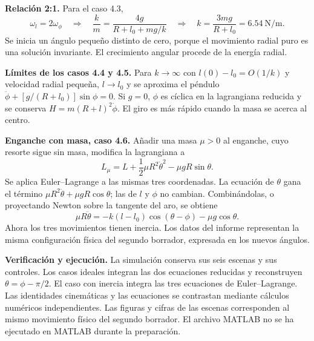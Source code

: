 \documentclass[11pt,a4paper]{article}
\begin{document}
\textbf{Relación 2:1.} Para el caso 4.3,
\begin{equation}
 \omega_l=2\omega_\phi\quad\Longrightarrow\quad
 \frac km=\frac{4g}{R+l_0+mg/k}\quad\Longrightarrow\quad
 k=\frac{3mg}{R+l_0}=6.54\ \mathrm{N/m}.
\end{equation}
Se inicia un ángulo pequeño distinto de cero, porque el movimiento radial puro es una solución invariante. El crecimiento angular procede de la energía radial.

\textbf{Límites de los casos 4.4 y 4.5.} Para $k\to\infty$ con $l(0)-l_0=O(1/k)$ y velocidad radial pequeña, $l\to l_0$ y se aproxima el péndulo $\ddot\phi+[g/(R+l_0)]\sin\phi=0$. Si $g=0$, $\phi$ es cíclica en la lagrangiana reducida y se conserva $H=m(R+l)^2\dot\phi$. El giro es más rápido cuando la masa se acerca al centro.

\textbf{Enganche con masa, caso 4.6.} Añadir una masa $\mu>0$ al enganche, cuyo resorte sigue sin masa, modifica la lagrangiana a
\begin{equation}
 L_\mu=L+\frac12\mu R^2\dot\theta^2-\mu gR\sin\theta.
\end{equation}
Se aplica Euler--Lagrange a las mismas tres coordenadas. La ecuación de $\theta$ gana el término $\mu R^2\ddot\theta+\mu gR\cos\theta$; las de $l$ y $\phi$ no cambian. Combinándolas, o proyectando Newton sobre la tangente del aro, se obtiene
\begin{equation}
 \mu R\ddot\theta=-k(l-l_0)\cos(\theta-\phi)-\mu g\cos\theta.
\end{equation}
Ahora los tres movimientos tienen inercia. Los datos del informe representan la misma configuración física del segundo borrador, expresada en los nuevos ángulos.

\begin{tcolorbox}
\small\textbf{Verificación y ejecución.} La simulación conserva sus seis escenas y sus controles. Los casos ideales integran las dos ecuaciones reducidas y reconstruyen $\theta=\phi-\pi/2$. El caso con inercia integra las tres ecuaciones de Euler--Lagrange. Las identidades cinemáticas y las ecuaciones se contrastan mediante cálculos numéricos independientes. Las figuras y cifras de las escenas corresponden al mismo movimiento físico del segundo borrador. El archivo MATLAB no se ha ejecutado en MATLAB durante la preparación.
\end{tcolorbox}
\end{document}
